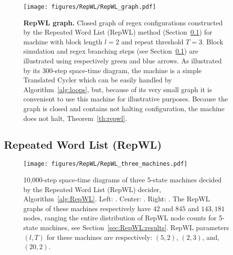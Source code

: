 
\newpage








\begin{figure}[h!]
    \centering
    \texttt{[image: figures/RepWL/RepWL\_graph.pdf]}
    \caption{{\small \textbf{RepWL graph.} Closed graph of regex configurations constructed by the Repeated Word List (RepWL) method (Section~\ref{sec:RepWL}) for machine  with block length $l=2$ and repeat threshold $T=3$. Block simulation and regex branching steps (see Section~\ref{sec:RepWL}) are illustrated using respectively green and blue arrows. As illustrated by its 300-step space-time diagram, the machine is a simple Translated Cycler which can be easily handled by Algorithm~\ref{alg:loops}, but, because of its very small graph it is convenient to use this machine for illustrative purposes. Because the graph is closed and contains not halting configuration, the machine does not halt, Theorem~\ref{th:repwl}.}}\label{fig:repWL}
\end{figure}

\subsection{Repeated Word List (RepWL)}\label{sec:RepWL}

\begin{figure}[h!]
    \centering
    \texttt{[image: figures/RepWL/RepWL\_three\_machines.pdf]}
    \caption{10,000-step space-time diagrams of three 5-state machines decided by the Repeated Word List (RepWL) decider, Algorithm~\ref{alg:RepWL}. Left: {\small {}}. Center: {\small {}}. Right: {\small {}}. The RepWL graphs of these machines respectively have 42 and $845$ and $143{,}181$ nodes, ranging the entire distribution of RepWL node counts for 5-state machines, see Section~\ref{sec:RepWL:results}. RepWL parameters $(l,T)$ for these machines are respectively: $(5,2)$, $(2,3)$, and, $(20,2)$.
    }\label{fig:repWLThree}
\end{figure}


